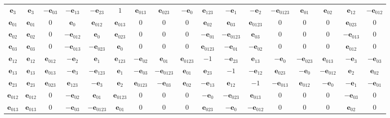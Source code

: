 \documentclass[10pt]{article}
\begin{document}
\begin{table}[!ht]
{\begin{tabular}{c|cccccccccccccccc}
$\mathbf{e}_3$ & $\mathbf{e}_3$ & $-\mathbf{e}_{03}$ & $-\mathbf{e}_{13}$ & $-\mathbf{e}_{23}$ & $1$ & $\mathbf{e}_{013}$ & $\mathbf{e}_{023}$ & $-\mathbf{e}_0$ & $\mathbf{e}_{123}$ & $-\mathbf{e}_1$ & $-\mathbf{e}_2$ & $-\mathbf{e}_{0123}$ & $\mathbf{e}_{01}$ & $\mathbf{e}_{02}$ & $\mathbf{e}_{12}$ & $-\mathbf{e}_{012}$ \\
$\mathbf{e}_{01}$ & $\mathbf{e}_{01}$ & $0$ & $\mathbf{e}_0$ & $\mathbf{e}_{012}$ & $\mathbf{e}_{013}$ & $0$ & $0$ & $0$ & $\mathbf{e}_{02}$ & $\mathbf{e}_{03}$ & $\mathbf{e}_{0123}$ & $0$ & $0$ & $0$ & $\mathbf{e}_{023}$ & $0$ \\
$\mathbf{e}_{02}$ & $\mathbf{e}_{02}$ & $0$ & $-\mathbf{e}_{012}$ & $\mathbf{e}_0$ & $\mathbf{e}_{023}$ & $0$ & $0$ & $0$ & $-\mathbf{e}_{01}$ & $-\mathbf{e}_{0123}$ & $\mathbf{e}_{03}$ & $0$ & $0$ & $0$ & $-\mathbf{e}_{013}$ & $0$ \\
$\mathbf{e}_{03}$ & $\mathbf{e}_{03}$ & $0$ & $-\mathbf{e}_{013}$ & $-\mathbf{e}_{023}$ & $\mathbf{e}_0$ & $0$ & $0$ & $0$ & $\mathbf{e}_{0123}$ & $-\mathbf{e}_{01}$ & $-\mathbf{e}_{02}$ & $0$ & $0$ & $0$ & $\mathbf{e}_{012}$ & $0$ \\
$\mathbf{e}_{12}$ & $\mathbf{e}_{12}$ & $\mathbf{e}_{012}$ & $-\mathbf{e}_2$ & $\mathbf{e}_1$ & $\mathbf{e}_{123}$ & $-\mathbf{e}_{02}$ & $\mathbf{e}_{01}$ & $\mathbf{e}_{0123}$ & $-1$ & $-\mathbf{e}_{23}$ & $\mathbf{e}_{13}$ & $-\mathbf{e}_0$ & $-\mathbf{e}_{023}$ & $\mathbf{e}_{013}$ & $-\mathbf{e}_3$ & $-\mathbf{e}_{03}$ \\
$\mathbf{e}_{13}$ & $\mathbf{e}_{13}$ & $\mathbf{e}_{013}$ & $-\mathbf{e}_3$ & $-\mathbf{e}_{123}$ & $\mathbf{e}_1$ & $-\mathbf{e}_{03}$ & $-\mathbf{e}_{0123}$ & $\mathbf{e}_{01}$ & $\mathbf{e}_{23}$ & $-1$ & $-\mathbf{e}_{12}$ & $\mathbf{e}_{023}$ & $-\mathbf{e}_0$ & $-\mathbf{e}_{012}$ & $\mathbf{e}_2$ & $\mathbf{e}_{02}$ \\
$\mathbf{e}_{23}$ & $\mathbf{e}_{23}$ & $\mathbf{e}_{023}$ & $\mathbf{e}_{123}$ & $-\mathbf{e}_3$ & $\mathbf{e}_2$ & $\mathbf{e}_{0123}$ & $-\mathbf{e}_{03}$ & $\mathbf{e}_{02}$ & $-\mathbf{e}_{13}$ & $\mathbf{e}_{12}$ & $-1$ & $-\mathbf{e}_{013}$ & $\mathbf{e}_{012}$ & $-\mathbf{e}_0$ & $-\mathbf{e}_1$ & $-\mathbf{e}_{01}$ \\
$\mathbf{e}_{012}$ & $\mathbf{e}_{012}$ & $0$ & $-\mathbf{e}_{02}$ & $\mathbf{e}_{01}$ & $\mathbf{e}_{0123}$ & $0$ & $0$ & $0$ & $-\mathbf{e}_0$ & $-\mathbf{e}_{023}$ & $\mathbf{e}_{013}$ & $0$ & $0$ & $0$ & $-\mathbf{e}_{03}$ & $0$ \\
$\mathbf{e}_{013}$ & $\mathbf{e}_{013}$ & $0$ & $-\mathbf{e}_{03}$ & $-\mathbf{e}_{0123}$ & $\mathbf{e}_{01}$ & $0$ & $0$ & $0$ & $\mathbf{e}_{023}$ & $-\mathbf{e}_0$ & $-\mathbf{e}_{012}$ & $0$ & $0$ & $0$ & $\mathbf{e}_{02}$ & $0$ \\

\end{tabular}}
\end{table}
\end{document}
